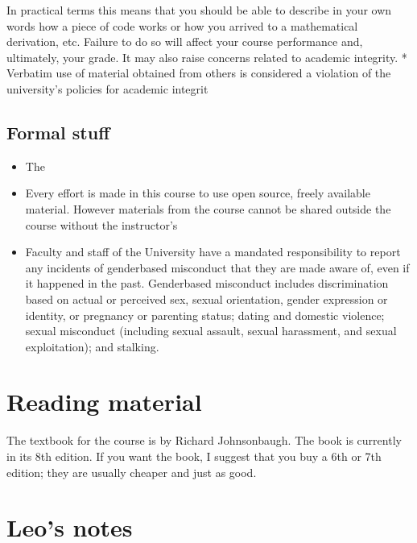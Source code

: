 \documentclass[letterpaper,10pt,english]{sphinxmanual}
\begin{document}
In practical terms this means that you should be able to describe in your own words how a piece of code works or how you arrived to a mathematical derivation, etc. Failure to do so will affect your course performance and, ultimately, your grade. It may also raise concerns related to academic integrity. * Verbatim use of material obtained from others is considered a violation of the university’s policies for academic integrit


\subsection{Formal stuff}
\label{\detokenize{COMP271/organization:formal-stuff}}\begin{itemize}
\item {} 
The 

\item {} 
Every effort is made in this course to use open source, freely available material. However materials from the course cannot be shared outside the course without the instructor’s 

\item {} 
 Faculty and staff of the University have a mandated responsibility to report any incidents of gender\sphinxhyphen{}based misconduct that they are made aware of, even if it happened in the past. Gender\sphinxhyphen{}based misconduct includes discrimination based on actual or perceived sex, sexual orientation, gender expression or identity, or pregnancy or parenting status; dating and domestic violence; sexual misconduct (including sexual assault, sexual harassment, and sexual exploitation); and stalking.

\end{itemize}


\section{Reading material}
\label{\detokenize{COMP271/reading:reading-material}}\label{\detokenize{COMP271/reading::doc}}
The  textbook for the course is  by Richard Johnsonbaugh. The book is currently in its 8th edition. If you want the book, I suggest that you buy a 6th or 7th edition; they are usually cheaper and just as good.


\section{Leo’s notes}
\label{\detokenize{COMP271/notes:leo-s-notes}}\label{\detokenize{COMP271/notes::doc}}


\renewcommand{\indexname}{Index}
\printindex
\end{document}
